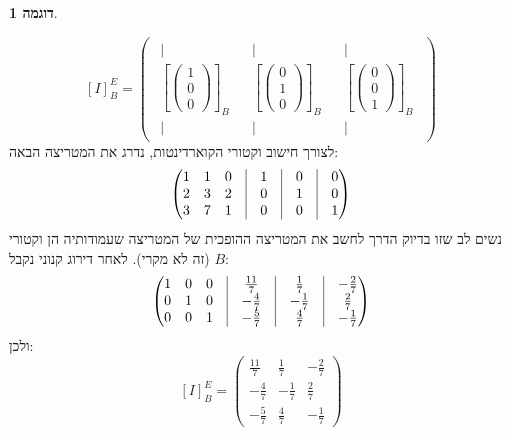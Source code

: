 \documentclass[12pt]{report}
\theoremstyle{plain}
\theoremstyle{definition}
\newtheorem{example}{דוגמה}[chapter]
\newcommand{\0}{\mathbf{0}}
\begin{document}
\begin{example}
\begin{enumerate}[label=\alph*.]
$$
[I]_B^E=\begin{pmatrix}
\begin{array}{c}
|\\[-0.4ex]
\left[\begin{pmatrix}1\\0\\0\end{pmatrix}\right]_B\\[-0.4ex]
|
\end{array}
&
\begin{array}{c}
|\\[-0.4ex]
\left[\begin{pmatrix}0\\1\\0\end{pmatrix}\right]_B\\[-0.4ex]
|
\end{array}
&
\begin{array}{c}
|\\[-0.4ex]
\left[\begin{pmatrix}0\\0\\1\end{pmatrix}\right]_B\\[-0.4ex]
|
\end{array}
\end{pmatrix}
$$
לצורך חישוב וקטורי הקוארדינטות, נדרג את המטריצה הבאה:
$$
\begin{pmatrix}
1 & 1 & 0 & \vline & 1 & \vline & 0 & \vline & 0 \\
2 & 3 & 2 & \vline & 0 & \vline & 1 & \vline & 0 \\
3 & 7 & 1 & \vline & 0 & \vline & 0 & \vline & 1
\end{pmatrix}
$$
נשים לב שזו בדיוק הדרך לחשב את המטריצה ההופכית של המטריצה שעמודותיה הן וקטורי
$B$
(זה לא מקרי).
לאחר דירוג קנוני נקבל:
$$
\begin{pmatrix}
1 & 0 & 0 & \vline & \frac{11}{7} & \vline & \frac{1}{7} & \vline & -\frac{2}{7} \\
0 & 1 & 0 & \vline & -\frac{4}{7} & \vline & -\frac{1}{7} & \vline & \frac{2}{7} \\
0 & 0 & 1 & \vline & -\frac{5}{7} & \vline & \frac{4}{7} & \vline & -\frac{1}{7}
\end{pmatrix}
$$
ולכן:
$$
[I]_B^E=\begin{pmatrix}
\frac{11}{7} & \frac{1}{7} & -\frac{2}{7} \\
-\frac{4}{7} & -\frac{1}{7} & \frac{2}{7} \\
-\frac{5}{7} & \frac{4}{7} & -\frac{1}{7}
\end{pmatrix}
$$

\end{enumerate}
\end{example}
\end{document}
